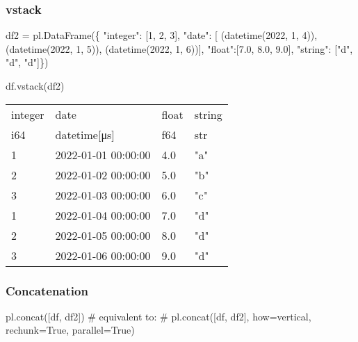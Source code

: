 \documentclass[
  letterpaper,
  DIV=11,
  numbers=noendperiod]{scrartcl}
\newenvironment{Shaded}{\begin{snugshade}}{\end{snugshade}}
\newcommand{\CommentTok}[1]{\textcolor[rgb]{0.37,0.37,0.37}{#1}}
\newcommand{\DecValTok}[1]{\textcolor[rgb]{0.68,0.00,0.00}{#1}}
\newcommand{\FloatTok}[1]{\textcolor[rgb]{0.68,0.00,0.00}{#1}}
\newcommand{\NormalTok}[1]{\textcolor[rgb]{0.00,0.23,0.31}{#1}}
\newcommand{\OperatorTok}[1]{\textcolor[rgb]{0.37,0.37,0.37}{#1}}
\newcommand{\StringTok}[1]{\textcolor[rgb]{0.13,0.47,0.30}{#1}}
\begin{document}
\hypertarget{vstack}{%
\subsubsection{vstack}\label{vstack}}

\begin{Shaded}
\begin{Highlighting}[]
\NormalTok{df2 }\OperatorTok{=}\NormalTok{ pl.DataFrame(\{}
  \StringTok{"integer"}\NormalTok{: [}\DecValTok{1}\NormalTok{, }\DecValTok{2}\NormalTok{, }\DecValTok{3}\NormalTok{], }
  \StringTok{"date"}\NormalTok{: [}
\NormalTok{    (datetime(}\DecValTok{2022}\NormalTok{, }\DecValTok{1}\NormalTok{, }\DecValTok{4}\NormalTok{)), }
\NormalTok{    (datetime(}\DecValTok{2022}\NormalTok{, }\DecValTok{1}\NormalTok{, }\DecValTok{5}\NormalTok{)), }
\NormalTok{    (datetime(}\DecValTok{2022}\NormalTok{, }\DecValTok{1}\NormalTok{, }\DecValTok{6}\NormalTok{))], }
    \StringTok{"float"}\NormalTok{:[}\FloatTok{7.0}\NormalTok{, }\FloatTok{8.0}\NormalTok{, }\FloatTok{9.0}\NormalTok{],}
    \StringTok{"string"}\NormalTok{: [}\StringTok{"d"}\NormalTok{, }\StringTok{"d"}\NormalTok{, }\StringTok{"d"}\NormalTok{]\})}


\NormalTok{df.vstack(df2)}
\end{Highlighting}
\end{Shaded}

\begin{longtable}[]{@{}llll@{}}
\toprule()
integer & date & float & string \\
i64 & datetime{[}μs{]} & f64 & str \\
\midrule()
\endhead
1 & 2022-01-01 00:00:00 & 4.0 & "a" \\
2 & 2022-01-02 00:00:00 & 5.0 & "b" \\
3 & 2022-01-03 00:00:00 & 6.0 & "c" \\
1 & 2022-01-04 00:00:00 & 7.0 & "d" \\
2 & 2022-01-05 00:00:00 & 8.0 & "d" \\
3 & 2022-01-06 00:00:00 & 9.0 & "d" \\
\bottomrule()
\end{longtable}

\hypertarget{concatenation}{%
\subsubsection{Concatenation}\label{concatenation}}

\begin{Shaded}
\begin{Highlighting}[]
\NormalTok{pl.concat([df, df2]) }
\CommentTok{\# equivalent to:}
\CommentTok{\# pl.concat([df, df2], how=\textquotesingle{}vertical\textquotesingle{}, rechunk=True, parallel=True) }
\end{Highlighting}
\end{Shaded}
\end{document}
